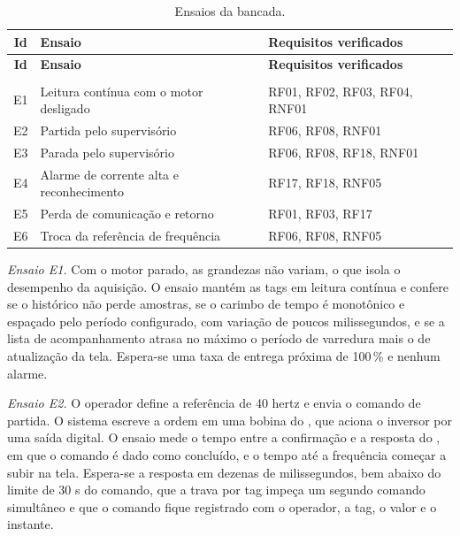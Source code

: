 {\renewcommand{\arraystretch}{1.3}\small
\begin{xltabular}{\textwidth}{cXX}
        \caption{Ensaios da bancada.}
        \label{tab:cap6_ensaios}\\
        \hline
        \textbf{Id} & \textbf{Ensaio} & \textbf{Requisitos verificados} \\
        \hline
        \endfirsthead
        \hline
        \textbf{Id} & \textbf{Ensaio} & \textbf{Requisitos verificados} \\
        \hline
        \endhead
        \endfoot
         \\
        \endlastfoot
        E1 & Leitura contínua com o motor desligado & RF01, RF02, RF03, RF04, RNF01 \\
        \hline
        E2 & Partida pelo supervisório & RF06, RF08, RNF01 \\
        \hline
        E3 & Parada pelo supervisório & RF06, RF08, RF18, RNF01 \\
        \hline
        E4 & Alarme de corrente alta e reconhecimento & RF17, RF18, RNF05 \\
        \hline
        E5 & Perda de comunicação e retorno & RF01, RF03, RF17 \\
        \hline
        E6 & Troca da referência de frequência & RF06, RF08, RNF05 \\
        \hline
\end{xltabular}}

\par \emph{Ensaio E1.} Com o motor parado, as grandezas não variam, o que isola o desempenho da aquisição. O ensaio mantém as tags em leitura contínua e confere se o histórico não perde amostras, se o carimbo de tempo é monotônico e espaçado pelo período configurado, com variação de poucos milissegundos, e se a lista de acompanhamento atrasa no máximo o período de varredura mais o de atualização da tela. Espera-se uma taxa de entrega próxima de 100\,\% e nenhum alarme.

\par \emph{Ensaio E2.} O operador define a referência de 40 hertz e envia o comando de partida. O sistema escreve a ordem em uma bobina do , que aciona o inversor por uma saída digital. O ensaio mede o tempo entre a confirmação e a resposta do , em que o comando é dado como concluído, e o tempo até a frequência começar a subir na tela. Espera-se a resposta em dezenas de milissegundos, bem abaixo do limite de 30 s do comando, que a trava por tag impeça um segundo comando simultâneo e que o comando fique registrado com o operador, a tag, o valor e o instante.

